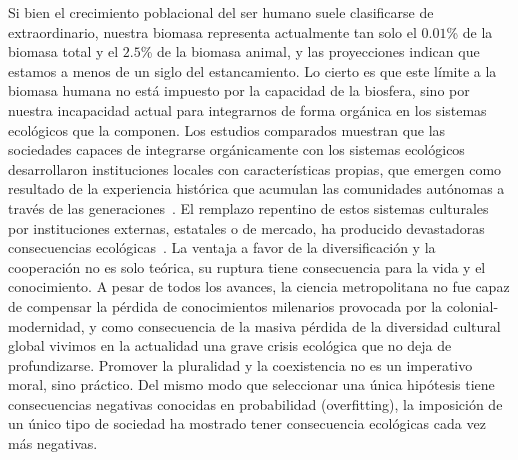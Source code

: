 \documentclass[a4paper,11pt]{book}
\theoremstyle{definition}
\begin{document}
Si bien el crecimiento poblacional del ser humano suele clasificarse de extraordinario, nuestra biomasa representa actualmente tan solo el $0.01$\% de la biomasa total y el $2.5$\% de la biomasa animal, y las proyecciones indican que estamos a menos de un siglo del estancamiento.
%
Lo cierto es que este l\'imite a la biomasa humana no est\'a impuesto por la capacidad de la biosfera, sino por nuestra incapacidad actual para integrarnos de forma org\'anica en los sistemas ecol\'ogicos que la componen.
%
Los estudios comparados muestran que las sociedades capaces de integrarse org\'anicamente con los sistemas ecol\'ogicos desarrollaron instituciones locales con caracter\'isticas propias, que emergen como resultado de la experiencia hist\'orica que acumulan las comunidades aut\'onomas a trav\'es de las generaciones~\cite{ostrom2010, ostrom1990}.
%
El remplazo repentino de estos sistemas culturales por instituciones externas, estatales o de mercado, ha producido devastadoras consecuencias ecol\'ogicas~\cite{segato2013-colonialidad}.
%
La ventaja a favor de la diversificaci\'on y la cooperaci\'on no es solo te\'orica, su ruptura tiene consecuencia para la vida y el conocimiento.
%
A pesar de todos los avances, la ciencia metropolitana no fue capaz de compensar la p\'erdida de conocimientos milenarios provocada por la colonial-modernidad, y como consecuencia de la masiva p\'erdida de la diversidad cultural global vivimos en la actualidad una grave crisis ecol\'ogica que no deja de profundizarse.
%
Promover la pluralidad y la coexistencia no es un imperativo moral, sino pr\'actico.
%
Del mismo modo que seleccionar una \'unica hip\'otesis tiene consecuencias negativas conocidas en probabilidad (overfitting), la imposici\'on de un \'unico tipo de sociedad ha mostrado tener consecuencia ecol\'ogicas cada vez m\'as negativas.
\end{document}
